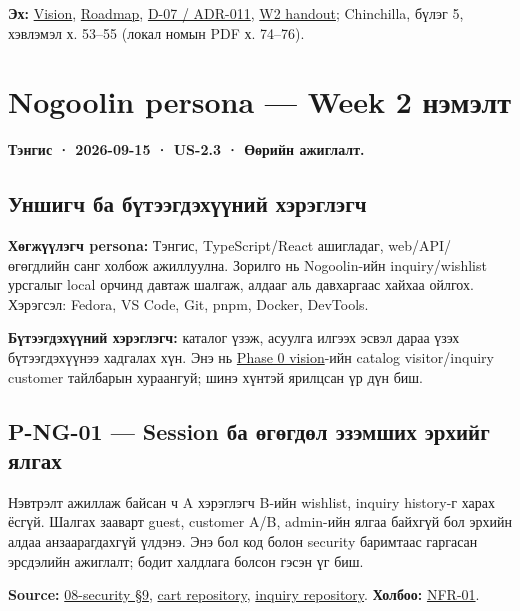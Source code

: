 \documentclass[
  11pt,
  a4paper,
]{article}
\begin{document}
\textbf{Эх:} \href{../../phase-0/01-vision.md}{Vision},
\href{../../phase-0/10-roadmap.md}{Roadmap},
\href{../../../agent-context/DECISIONS.md}{D-07 / ADR-011},
\href{Software_Project_Documentation_Week_02_Handout.pdf}{W2 handout};
Chinchilla, бүлэг 5, хэвлэмэл х. 53--55 (локал номын PDF х. 74--76).

\clearpage
\section{Nogoolin persona --- Week 2
нэмэлт}\label{doc2-nogoolin-persona-week-2-ux43dux44dux43cux44dux43bux442}

\textbf{Тэнгис · 2026-09-15 · US-2.3 · Өөрийн ажиглалт.}

\subsection{Уншигч ба бүтээгдэхүүний
хэрэглэгч}\label{doc2-ux443ux43dux448ux438ux433ux447-ux431ux430-ux431ux4afux442ux44dux44dux433ux434ux44dux445ux4afux4afux43dux438ux439-ux445ux44dux440ux44dux433ux43bux44dux433ux447}

\textbf{Хөгжүүлэгч persona:} Тэнгис, TypeScript/React ашигладаг,
web/API/өгөгдлийн санг холбож ажиллуулна. Зорилго нь Nogoolin-ийн
inquiry/wishlist урсгалыг local орчинд давтаж шалгаж, алдааг аль
давхаргаас хайхаа ойлгох. Хэрэгсэл: Fedora, VS Code, Git, pnpm, Docker,
DevTools.

\textbf{Бүтээгдэхүүний хэрэглэгч:} каталог үзэж, асуулга илгээх эсвэл
дараа үзэх бүтээгдэхүүнээ хадгалах хүн. Энэ нь
\href{../../phase-0/01-vision.md}{Phase 0 vision}-ийн catalog
visitor/inquiry customer тайлбарын хураангуй; шинэ хүнтэй ярилцсан үр
дүн биш.

\subsection{P-NG-01 --- Session ба өгөгдөл эзэмших эрхийг
ялгах}\label{doc2-p-ng-01-session-ux431ux430-ux4e9ux433ux4e9ux433ux434ux4e9ux43b-ux44dux437ux44dux43cux448ux438ux445-ux44dux440ux445ux438ux439ux433-ux44fux43bux433ux430ux445}

Нэвтрэлт ажиллаж байсан ч A хэрэглэгч B-ийн wishlist, inquiry history-г
харах ёсгүй. Шалгах зааварт guest, customer A/B, admin-ийн ялгаа байхгүй
бол эрхийн алдаа анзаарагдахгүй үлдэнэ. Энэ бол код болон security
баримтаас гаргасан эрсдэлийн ажиглалт; бодит халдлага болсон гэсэн үг
биш.

\textbf{Source:}
\href{../../phase-0/08-security.md\#9-idor-prevention}{08-security §9},
\href{../../../backend/api/src/repositories/supabase/cart.repository.ts}{cart
repository},
\href{../../../backend/api/src/repositories/supabase/inquiry.repository.ts}{inquiry
repository}. \textbf{Холбоо:}
\href{../../requirements/requirements.md\#nfr-01}{NFR-01}.
\end{document}
